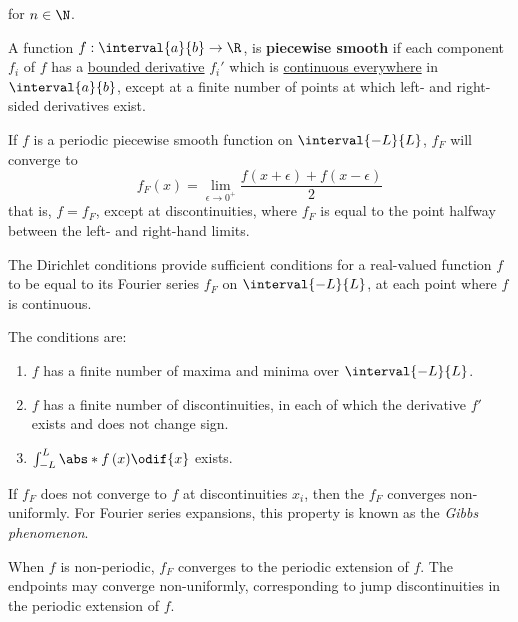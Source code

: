 \documentclass{article}
\begin{document}
for \(n \in \N\).
\begin{definition}
    A function \(f : \interval{a}{b} \to \R\), is \textbf{piecewise smooth} if each component \(f_i\) of \(f\) has a \underline{bounded derivative} \(f_i'\) which is \underline{continuous everywhere} in \(\interval{a}{b}\), except at
    a finite number of points at which left- and right-sided derivatives exist.
\end{definition}
\begin{theorem}
    If \(f\) is a periodic piecewise smooth function on \(\interval{-L}{L}\), \(f_F\) will converge to
    \begin{equation*}
        f_F\left( x \right) = \lim_{\epsilon \to 0^{+}} \frac{f\left( x + \epsilon \right) + f\left( x - \epsilon \right)}{2}
    \end{equation*}
    that is, \(f = f_F\), except at discontinuities, where \(f_F\) is equal to the point halfway between the left- and right-hand limits.
\end{theorem}
\begin{corollary}
    The Dirichlet conditions provide sufficient conditions for a real-valued function \(f\) to be
    equal to its Fourier series \(f_F\) on \(\interval{-L}{L}\), at each point where \(f\) is continuous.

    The conditions are:
    \begin{enumerate}
        \item \(f\) has a finite number of maxima and minima over \(\interval{-L}{L}\).
        \item \(f\) has a finite number of discontinuities, in each of which the derivative \(f'\) exists and does not change sign.
        \item \(\int_{-L}^L \abs*{f\left( x \right)} \odif{x}\) exists.
    \end{enumerate}
\end{corollary}
\begin{definition}
    If \(f_F\) does not converge to \(f\) at discontinuities \(x_i\), then the \(f_F\) converges
    non-uniformly. For Fourier series expansions, this property is known as the \textit{Gibbs phenomenon}.
\end{definition}
\begin{note}
    When \(f\) is non-periodic, \(f_F\) converges to the periodic extension of \(f\).
    The endpoints may converge non-uniformly, corresponding to jump discontinuities in the periodic extension of \(f\).
\end{note}
\end{document}
